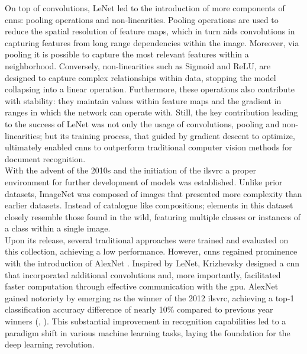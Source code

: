 
\noindent On top of convolutions, LeNet led to the introduction of more components of \glspl{cnn}: 
pooling operations and non-linearities. Pooling operations are used to reduce the spatial 
resolution of feature maps, which in turn aids convolutions in capturing features from long 
range dependencies within the image. Moreover, via pooling it is possible to capture the most 
relevant features within a neighborhood.
Conversely, non-linearities such as Sigmoid and ReLU, are designed to capture complex 
relationships within data, stopping the model collapsing into a linear operation. Furthermore, these 
operations also contribute with stability: they maintain values within feature maps and the gradient 
in ranges in which the network can operate with. %
Still, the key contribution leading to the success of LeNet was not only the usage of 
convolutions, pooling and non-linearities; but its training process, that guided by gradient descent 
to optimize, ultimately enabled \glspl{cnn} to outperform traditional computer vision methods for 
document recognition. \\

\noindent With the advent of the 2010s and the initiation of the \gls{ilsvrc} \autocite{ILSVRC15} 
a proper environment for further development of models was established. Unlike prior datasets, 
ImageNet was composed of images that presented more complexity than earlier datasets. Instead 
of catalogue like compositions; elements in this dataset closely resemble those found 
in the wild, featuring multiple classes or instances of a class within a single image.\\

\noindent Upon its release, several traditional approaches were trained and evaluated on this 
collection, achieving a low performance. However, \glspl{cnn} regained prominence with the 
introduction of AlexNet \autocite{krizhevsky2012imagenet}. Inspired by LeNet, Krizhevsky designed a 
\gls{cnn} that incorporated additional convolutions and, more importantly, facilitated faster 
computation through effective communication with the \gls{gpu}.
AlexNet gained notoriety by emerging as the winner of the 2012 \gls{ilsvrc}, achieving a top-1 
classification accuracy difference of nearly 10\% compared to previous year winners 
(\cite{berg2010large}, \cite{sanchez2011high}). This substantial improvement in recognition 
capabilities led to a paradigm shift in various machine learning tasks, laying the foundation 
for the deep learning revolution.\\

